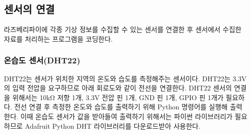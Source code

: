 \subsection{센서의 연결}

라즈베리파이에 각종 기상 정보를 수집할 수 있는 센서를 연결한 후 센서에서 수집한 자료를 처리하는 프로그램을 코딩한다. \cite{Ref2}

\begin{table}[htbp]
	\caption{연구에서 사용한 센서의 목록}
	\label{SENSOR}
\end{table}

\subsubsection{온습도 센서(DHT22)}
DHT22는 센서가 위치한 지역의 온도와 습도를 측정해주는 센서이다. DHT22는 3.3V의 입력 전압을 요구하므로 아래 회로도와 같이 전선을 연결한다. DHT22 센서의 연결을 위해서는 10kΩ 저항 1개, 3.3V 전압 핀 1개, GND 핀 1개, GPIO 핀 1개가 필요하다. 전선 연결 후 측정한 온도와 습도를 출력하기 위해 Python 명령어를 실행해 출력한다. 이때 온습도 센서가 값을 받아들여 출력하기 위해서는 파이썬 라이브러리가 필요하므로 Adafruit Python DHT 라이브러리를 다운로드받아 사용한다.

